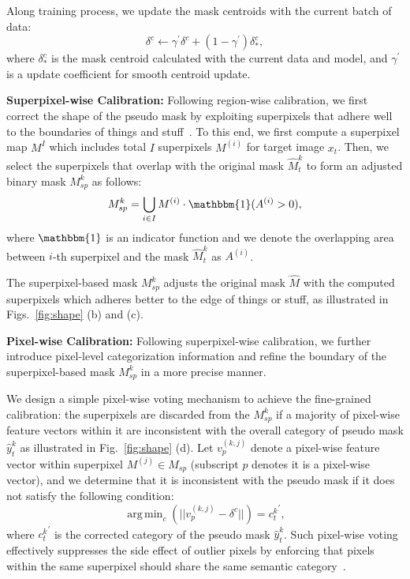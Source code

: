 \documentclass[10pt,twocolumn,letterpaper]{article}
\DeclareMathOperator*{\argmin}{arg\,min}
\begin{document}
Along training process, we update the mask centroids with the current batch of data:
\begin{equation}
\label{eq6}
 \delta^{c} \leftarrow \gamma^{\prime} \delta^{c} + (1-\gamma^{\prime}) \delta_*^c ,
\end{equation}
where $\delta_*^c$ is the mask centroid calculated with the current data and model, and $\gamma^{\prime}$ is a update coefficient for smooth centroid update.

\noindent \textbf{Superpixel-wise Calibration:}
Following region-wise calibration, we first correct the shape of the pseudo mask by exploiting superpixels that adhere well to the boundaries of things and stuff~\cite{achanta2012slic}.
To this end, we first compute a superpixel map $M^I$ which includes total $I$ superpixels $M^{(i)}$ for target image $x_t$. Then, we select the superpixels that overlap with the original mask $\hat{M}_t^k$ to form an adjusted binary mask $M_{sp}^k$ as follows:
\begin{equation}
\label{eq7}
M_{sp}^k = \bigcup_{i\in I} M^{(i)} \cdot \mathbbm{1} (A^{(i)}> 0), 
\end{equation}
where $\mathbbm{1}$ is an indicator function and we denote the overlapping area between $i$-th superpixel and the mask $\hat{M}_t^k$ as $A^{(i)}$.

The superpixel-based mask $M_{sp}^k$ adjusts the original mask $\hat{M}$ with the computed superpixels which adheres better to the edge of things or stuff, as illustrated in Figs.~\ref{fig:shape} (b) and (c).

\noindent \textbf{Pixel-wise Calibration:} 
Following superpixel-wise calibration, we further introduce pixel-level categorization information and refine the boundary of the superpixel-based mask $M_{sp}^k$ in a more precise manner. 

We design a simple pixel-wise voting mechanism to achieve the fine-grained calibration: the superpixels are discarded from the $M_{sp}^k$ if a majority of pixel-wise feature vectors within it are inconsistent with the overall category of pseudo mask $\hat{y}_t^k$ as illustrated in Fig.~\ref{fig:shape} (d).
Let $v_p^{(k,j)}$ denote a pixel-wise feature vector within superpixel $M^{(j)} \in M_{sp}$ (subscript $p$ denotes it is a pixel-wise vector), and we determine that it is inconsistent with the pseudo mask if it does not satisfy the following condition:
\begin{equation}
\label{eq8}
\argmin_c (||v_p^{(k,j)} - \delta^c ||) = {c_t^k}^{\prime},
\end{equation}
where ${c_t^k}^{\prime}$ is the corrected category of the pseudo mask $\hat{y}_t^k$. 
Such pixel-wise voting effectively suppresses the side effect of outlier pixels by enforcing that pixels within the same superpixel should share the same semantic category~\cite{achanta2012slic}. 
\end{document}

